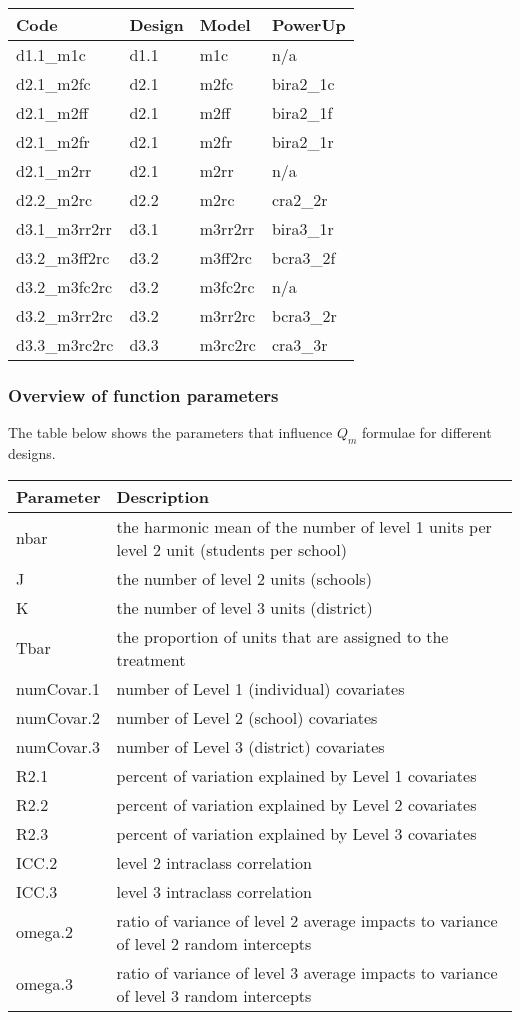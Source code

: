 \documentclass[
]{article}
\begin{document}
\begin{tabular}{l|l|l|l}
\hline
Code & Design & Model & PowerUp\\
\hline
d1.1\_m1c & d1.1 & m1c & n/a\\
\hline
d2.1\_m2fc & d2.1 & m2fc & bira2\_1c\\
\hline
d2.1\_m2ff & d2.1 & m2ff & bira2\_1f\\
\hline
d2.1\_m2fr & d2.1 & m2fr & bira2\_1r\\
\hline
d2.1\_m2rr & d2.1 & m2rr & n/a\\
\hline
d2.2\_m2rc & d2.2 & m2rc & cra2\_2r\\
\hline
d3.1\_m3rr2rr & d3.1 & m3rr2rr & bira3\_1r\\
\hline
d3.2\_m3ff2rc & d3.2 & m3ff2rc & bcra3\_2f\\
\hline
d3.2\_m3fc2rc & d3.2 & m3fc2rc & n/a\\
\hline
d3.2\_m3rr2rc & d3.2 & m3rr2rc & bcra3\_2r\\
\hline
d3.3\_m3rc2rc & d3.3 & m3rc2rc & cra3\_3r\\
\hline
\end{tabular}

\subsubsection{Overview of function parameters}
\label{sec:params}

The table below shows the parameters that influence \(Q_m\) formulae for
different designs.

\begin{tabular}{l|l}
\hline
Parameter & Description\\
\hline
nbar & the harmonic mean of the number of level 1 units per level 2 unit (students per school)\\
\hline
J & the number of level 2 units (schools)\\
\hline
K & the number of level 3 units (district)\\
\hline
Tbar & the proportion of units that are assigned to the treatment\\
\hline
numCovar.1 & number of Level 1 (individual) covariates\\
\hline
numCovar.2 & number of Level 2 (school) covariates\\
\hline
numCovar.3 & number of Level 3 (district) covariates\\
\hline
R2.1 & percent of variation explained by Level 1 covariates\\
\hline
R2.2 & percent of variation explained by Level 2 covariates\\
\hline
R2.3 & percent of variation explained by Level 3 covariates\\
\hline
ICC.2 & level 2 intraclass correlation\\
\hline
ICC.3 & level 3 intraclass correlation\\
\hline
omega.2 & ratio of variance of level 2 average impacts to variance of level 2 random intercepts\\
\hline
omega.3 & ratio of variance of level 3 average impacts to variance of level 3 random intercepts\\
\hline
\end{tabular}
\end{document}
